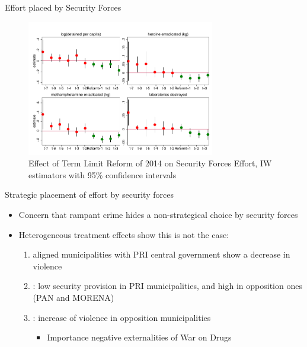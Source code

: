 \documentclass{beamer}
\begin{document}
\begin{frame}[label=effort_security]{Effort placed by Security Forces}

\begin{figure}[h] 
\centering 
\caption{Effect of Term Limit Reform of 2014 on Security Forces Effort, IW estimators with 95\% confidence intervals}
\label{fig:effort_security}
\includegraphics[width=0.73\textwidth]{Figures_pres/effort_security.pdf}
       \captionsetup{justification=centering}

 
\end{figure}  

\end{frame}
\begin{frame}[label=effort]{Strategic placement of effort by security forces}

\begin{itemize}
 		  \setlength\itemsep{1em}   
	
	\item Concern that rampant crime hides a non-strategical choice by security forces
	\item Heterogeneous treatment effects show this is not the case:
	\begin{enumerate}
	 		  \setlength\itemsep{0.5em}   
		\item \hyperlink{strategic1}{} aligned municipalities with PRI central government show a decrease in violence  
		\item \hyperlink{strategic2}{}: low security provision in PRI municipalities, and high in opposition ones (PAN and MORENA)  
		\item \hyperlink{strategic3}{}: increase of violence in opposition municipalities 
		\begin{itemize}
		\item Importance negative externalities of War on Drugs
		\end{itemize}
	\end{enumerate} 
\end{itemize}
	
\end{frame}
\end{document}
